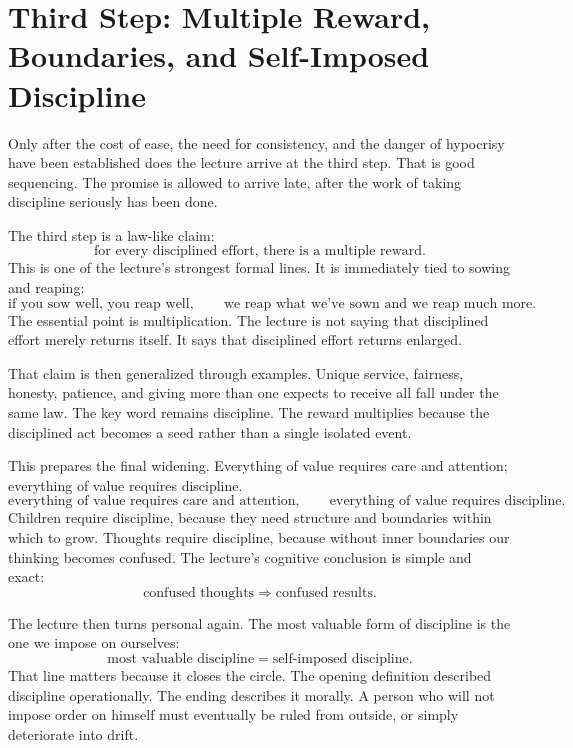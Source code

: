 \section{Third Step: Multiple Reward, Boundaries, and Self-Imposed Discipline}

Only after the cost of ease, the need for consistency, and the danger of hypocrisy have been established does the lecture arrive at the third step. That is good sequencing. The promise is allowed to arrive late, after the work of taking discipline seriously has been done.

The third step is a law-like claim:
\begin{equation}
\text{for every disciplined effort, there is a multiple reward}.
\end{equation}
This is one of the lecture's strongest formal lines. It is immediately tied to sowing and reaping:
\begin{equation}
\text{if you sow well, you reap well}, \qquad
\text{we reap what we've sown and we reap much more}.
\end{equation}
The essential point is multiplication. The lecture is not saying that disciplined effort merely returns itself. It says that disciplined effort returns enlarged.

That claim is then generalized through examples. Unique service, fairness, honesty, patience, and giving more than one expects to receive all fall under the same law. The key word remains discipline. The reward multiplies because the disciplined act becomes a seed rather than a single isolated event.

This prepares the final widening. Everything of value requires care and attention; everything of value requires discipline.
\begin{equation}
\text{everything of value requires care and attention}, \qquad
\text{everything of value requires discipline}.
\end{equation}
Children require discipline, because they need structure and boundaries within which to grow. Thoughts require discipline, because without inner boundaries our thinking becomes confused. The lecture's cognitive conclusion is simple and exact:
\begin{equation}
\text{confused thoughts} \Rightarrow \text{confused results}.
\end{equation}

The lecture then turns personal again. The most valuable form of discipline is the one we impose on ourselves:
\begin{equation}
\text{most valuable discipline} = \text{self-imposed discipline}.
\end{equation}
That line matters because it closes the circle. The opening definition described discipline operationally. The ending describes it morally. A person who will not impose order on himself must eventually be ruled from outside, or simply deteriorate into drift.

